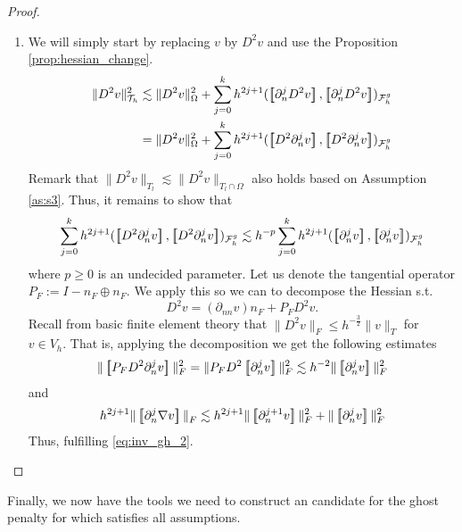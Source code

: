 \begin{proof}
\begin{enumerate}[label=\arabic*)]
    \item We will simply start by replacing $v$  by $D^2 v$ and use the Proposition \ref{prop:hessian_change}.
        \[
            \begin{split}
                    \| D^2 v \|_{ \mathcal{T} _{h} }^{2  }&  \lesssim \| D^2 v \|_{ \Omega  }^{ 2 }  + \sum_{j=0}^{k} h^{2j+1} ( \jump{   \partial ^{j}_{n} D^2 v }, \jump{  \partial ^{j}_{n} D^2 v}    )_{\mathcal{F}_{h}^{g}} \\
                    &=  \| D^2 v \|_{ \Omega  }^{ 2 }  + \sum_{j=0}^{k} h^{2j+1} ( \jump{   D^2 \partial ^{j}_{n}  v }, \jump{  D^2 \partial ^{j}_{n}  v}    )_{\mathcal{F}_{h}^{g}}
            \end{split}
        \]
        Remark that $\|  D^2 v \|_{ T_{l} }^{  } \lesssim  \|  D^2 v \|_{ T_{l} \cap \Omega  }^{  }  $ also holds based on Assumption \ref{as:s3}.
        Thus, it remains to show that \[
        \sum_{j=0}^{k} h^{2j+1} ( \jump{   D^2 \partial ^{j}_{n}  v }, \jump{  D^2 \partial ^{j}_{n}  v}    )_{\mathcal{F}_{h}^{g}} \lesssim h^{-p} \sum_{j=0}^{k} h^{2j+1} ( \jump{    \partial ^{j}_{n}  v }, \jump{  \partial ^{j}_{n}  v}    )_{\mathcal{F}_{h}^{g}}
        \]
        where $p \ge  0 $ is an undecided parameter.
        Let us denote the tangential operator $P_{F} := I - n_{F} \oplus n_{F} $. We apply this so we can to decompose the Hessian s.t. \[
        D^2 v = ( \partial _{nn}v)n_{F} + P_{F} D^2 v.
        \]
        Recall from basic finite element theory that $\| D^2v \|_{F  }^{  }\le h^{-\frac{3}{2}} \| v \|_{ T }^{  }    $ for $v \in  V_{h}$.
        That is, applying the decomposition we get the following estimates \[
        \| \jump{ P_{F}   D^2 \partial _{n}^{j} v }\|_{ F }^{ 2 } = \| P_{F} D^2 \jump{ \partial _{n}^{j} v }   \|_{ F  }^{ 2} \lesssim h^{-2} \|  \jump{ \partial ^{j}_{n} v }   \|_{ F }^{  2}
        \]
        and \[
            h^{2j +1} \| \jump{\partial ^{j}_{n} \nabla v}  \|_{ F }^{  } \lesssim h^{2j +1 } \| \jump{ \partial ^{j+1}_{n} v }   \|_{F  }^{ 2 } + \| \jump{ \partial ^{j}_{n}v }   \|_{ F }^{ 2 }
        \]
        Thus, fulfilling \eqref{eq:inv_gh_2}.

    \end{enumerate}

\end{proof}



Finally, we now have the tools we need to construct an candidate for the ghost penalty for which satisfies all assumptions.

